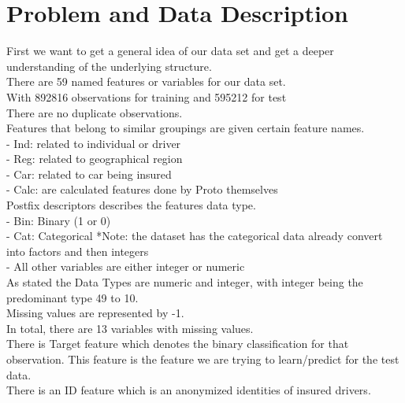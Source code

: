 \documentclass[fleqn,10pt]{SelfArx} %
\affiliation{\textsuperscript{1}\textit{Computer Science, School of Informatics , Computing and Engineering, Indiana University, Bloomington, IN, USA}} %
\begin{document}
\flushbottom %

\maketitle %

\tableofcontents %

\thispagestyle{empty} %






\section{Problem and Data Description} %




First we want to get a general idea of our data set and get a deeper understanding of the underlying structure.\\
There are 59 named features or variables for our data set. \\
With 892816 observations for training and 595212 for test\\
There are no duplicate observations. \\
Features that belong to similar groupings are given certain feature names.\\
- Ind: related to individual or driver\\
- Reg: related to geographical region\\
- Car: related to car being insured\\
- Calc: are calculated features done by Proto themselves\\
Postfix descriptors describes the features data type.\\
- Bin: Binary (1 or 0)\\
- Cat: Categorical *Note: the dataset has the categorical data already convert into factors and then integers\\
- All other variables are either integer or numeric\\
As stated the Data Types are numeric and integer, with integer being the predominant type 49 to 10.\\
Missing values are represented by -1.\\
In total, there are 13 variables with missing values.\\
There is Target feature which denotes the binary classification for that observation. This feature is the feature we are trying to learn/predict for the test data.\\
There is an ID feature which is an anonymized identities of insured drivers.  \\
\end{document}

